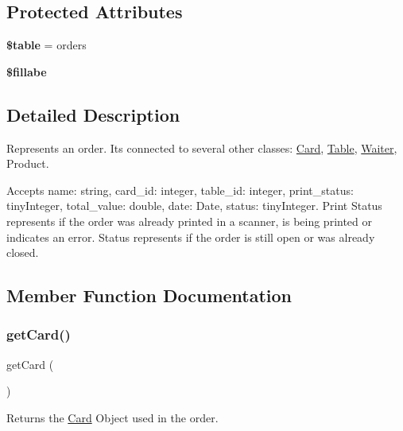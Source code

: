 \subsection*{Protected Attributes}
\begin{DoxyCompactItemize}
\item 
\mbox{\label{class_app_1_1_models_1_1_order_ae8876a14058f368335baccf35af4a22b}} 
{\bfseries \$table} = \textquotesingle{}orders\textquotesingle{}
\item 
{\bfseries \$fillabe}
\end{DoxyCompactItemize}


\subsection{Detailed Description}
Represents an order. It\textquotesingle{}s connected to several other classes\+: \mbox{\hyperlink{class_app_1_1_models_1_1_card}{Card}}, \mbox{\hyperlink{class_app_1_1_models_1_1_table}{Table}}, \mbox{\hyperlink{class_app_1_1_models_1_1_waiter}{Waiter}}, Product.

Accepts name\+: string, card\+\_\+id\+: integer, table\+\_\+id\+: integer, print\+\_\+status\+: tiny\+Integer, total\+\_\+value\+: double, date\+: Date, status\+: tiny\+Integer. Print Status represents if the order was already printed in a scanner, is being printed or indicates an error. Status represents if the order is still open or was already closed. 

\subsection{Member Function Documentation}
\mbox{\label{class_app_1_1_models_1_1_order_af3296e61356149835fcdba50e4075f56}} 
\subsubsection{\texorpdfstring{get\+Card()}{getCard()}}
{\footnotesize\ttfamily get\+Card (\begin{DoxyParamCaption}{ }\end{DoxyParamCaption})}

Returns the \mbox{\hyperlink{class_app_1_1_models_1_1_card}{Card}} Object used in the order.

